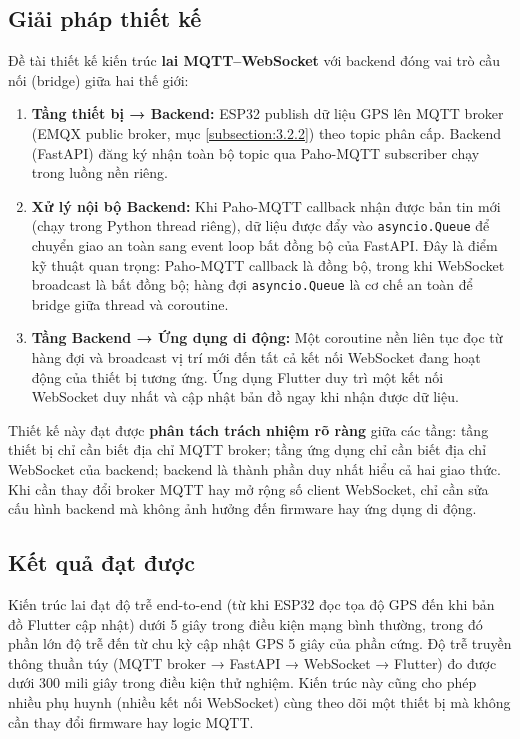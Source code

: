 \documentclass[../DoAn.tex]{subfiles}
\begin{document}
\subsection{Giải pháp thiết kế}

Đề tài thiết kế kiến trúc \textbf{lai MQTT–WebSocket} với backend đóng vai trò cầu nối (bridge) giữa hai thế giới:

\begin{enumerate}
    \item \textbf{Tầng thiết bị → Backend:} ESP32 publish dữ liệu GPS lên MQTT broker (EMQX public broker, mục \ref{subsection:3.2.2}) theo topic phân cấp. Backend (FastAPI) đăng ký nhận toàn bộ topic qua Paho-MQTT subscriber chạy trong luồng nền riêng.

    \item \textbf{Xử lý nội bộ Backend:} Khi Paho-MQTT callback nhận được bản tin mới (chạy trong Python thread riêng), dữ liệu được đẩy vào \texttt{asyncio.Queue} để chuyển giao an toàn sang event loop bất đồng bộ của FastAPI. Đây là điểm kỹ thuật quan trọng: Paho-MQTT callback là đồng bộ, trong khi WebSocket broadcast là bất đồng bộ; hàng đợi \texttt{asyncio.Queue} là cơ chế an toàn để bridge giữa thread và coroutine.

    \item \textbf{Tầng Backend → Ứng dụng di động:} Một coroutine nền liên tục đọc từ hàng đợi và broadcast vị trí mới đến tất cả kết nối WebSocket đang hoạt động của thiết bị tương ứng. Ứng dụng Flutter duy trì một kết nối WebSocket duy nhất và cập nhật bản đồ ngay khi nhận được dữ liệu.
\end{enumerate}

Thiết kế này đạt được \textbf{phân tách trách nhiệm rõ ràng} giữa các tầng: tầng thiết bị chỉ cần biết địa chỉ MQTT broker; tầng ứng dụng chỉ cần biết địa chỉ WebSocket của backend; backend là thành phần duy nhất hiểu cả hai giao thức. Khi cần thay đổi broker MQTT hay mở rộng số client WebSocket, chỉ cần sửa cấu hình backend mà không ảnh hưởng đến firmware hay ứng dụng di động.

\subsection{Kết quả đạt được}

Kiến trúc lai đạt độ trễ end-to-end (từ khi ESP32 đọc tọa độ GPS đến khi bản đồ Flutter cập nhật) dưới 5 giây trong điều kiện mạng bình thường, trong đó phần lớn độ trễ đến từ chu kỳ cập nhật GPS 5 giây của phần cứng. Độ trễ truyền thông thuần túy (MQTT broker → FastAPI → WebSocket → Flutter) đo được dưới 300 mili giây trong điều kiện thử nghiệm. Kiến trúc này cũng cho phép nhiều phụ huynh (nhiều kết nối WebSocket) cùng theo dõi một thiết bị mà không cần thay đổi firmware hay logic MQTT.
\end{document}
